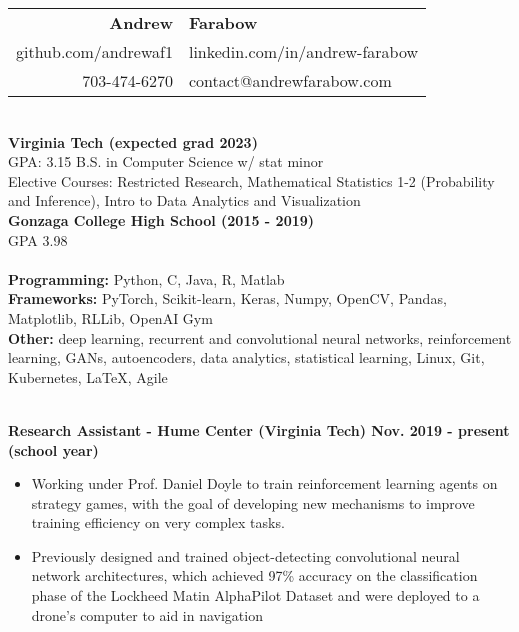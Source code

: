 \documentclass{article}
\begin{document}
  \begin{center}
    \begin{tabular}{r l}
      {\huge\textbf{Andrew}} & {\huge\textbf{Farabow}} \\
      \hspace{35pt} github.com/andrewaf1 & linkedin.com/in/andrew-farabow \\
      703-474-6270 & contact@andrewfarabow.com \\
    \end{tabular}


  \begin{flushleft}
    \begin{multicols}{2}
      {\large\textbf{\underline{}}} \\
      \textbf{Virginia Tech (expected grad 2023)} \\
      GPA: 3.15 \quad B.S. in Computer Science w/ stat minor \\
      Elective Courses: Restricted Research, Mathematical Statistics 1-2 (Probability and Inference), Intro to Data Analytics and Visualization\\
      \textbf{Gonzaga College High School	(2015 - 2019)} \\
      GPA 3.98 \\
     

    \columnbreak
    {\large\textbf{\underline{}}} \\
    {\textbf{Programming:}} Python, C, Java, R, Matlab \\
    {\textbf{Frameworks:}} PyTorch, Scikit-learn, Keras, Numpy, OpenCV, Pandas, Matplotlib, RLLib, OpenAI Gym \\
    {\textbf{Other:}} deep learning, recurrent and convolutional neural networks, reinforcement learning, GANs, autoencoders, data analytics, statistical learning, Linux, Git, Kubernetes, LaTeX, Agile \\

    \end{multicols}

    {\large\textbf{\underline{}}} \\
    
    \textbf{Research Assistant - Hume Center (Virginia Tech) \hfill Nov. 2019 - present (school year)}
    \begin{itemize}
      \itemsep0em
      \item Working under Prof. Daniel Doyle to train reinforcement learning agents on strategy games, with the goal of developing new mechanisms to improve training efficiency on very complex tasks. 
      \item Previously designed and trained object-detecting convolutional neural network architectures, which achieved 97\% accuracy on the classification phase of the Lockheed Matin AlphaPilot Dataset and were deployed to a drone's computer to aid in navigation
    \end{itemize}


\end{flushleft}
\end{center}
\end{document}
